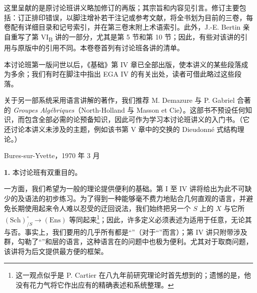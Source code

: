 这里呈献的是原讨论班讲义略加修订的再版；其宗旨和内容见引言。修订主要包括：订正排印错误，以脚注增补若干注记或参考文献，将全书划为目前的三卷，每卷配有详细目录和记号索引，并在第三卷末附上术语索引。此外，J.-E. Bertin 亲自重写了第 VI\textsubscript{B} 讲的一部分，尤其是第 5 节和第 10 节；因此，有些对该讲的引用与原版中的引用不同。本卷卷首列有讨论班各讲的清单。

本讨论班第一版问世以后，《基础》第 IV 章已全部出版，使本讲义的某些段落成为多余；我们有时在脚注中指出 EGA IV 的有关出处，读者可借此略过这些段落。

关于另一部系统采用语言讲解的著作，我们推荐 M. Demazure 与 P. Gabriel 合著的 \emph{Groupes Algébriques}（North-Holland 与 Masson et Cie）。这部书不预设任何知识，而包含全部必需的论预备知识，因此可作为学习本讨论班讲义的入门书。（它还讨论本讲义未涉及的主题，例如该书第 V 章中的交换的 Dieudonné 式结构理论。）

\begin{flushright}Bures-sur-Yvette，1970 年 3 月\end{flushright}
\textbf{1.} 本讨论班有双重目的。

一方面，我们希望为一般的理论提供便利的基础。第 I 至 IV 讲将给出为此不可缺少的及语法的初步练习。为了得到一种能够毫不费力地贴合几何直观的语言，并避免长期使用起来令人难以忍受的迂回说法，我们始终把另一个 $S$ 上的 $X$ 与它所 $(\mathrm{Sch})_{/S}^{\circ}\to(\mathrm{Ens})$ 等同起来\footnote{这一观点似乎是 P. Cartier 在八九年前研究理论时首先想到的；遗憾的是，他没有花力气将它作出应有的精确表述和系统整理。}；因此，许多定义必须表述为适用于任意，无论其与否。事实上，我们要用的几乎所有都是“”（对于“”而言）；第 IV 讲只附带涉及群，勾勒了“”和层的语言，这种语言在的问题中也极为便利。尤其对于取商问题，该讲将为后文提供最方便的框架。


